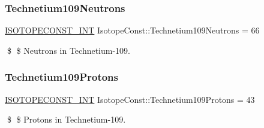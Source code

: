 \subsubsection{\texorpdfstring{Technetium109\+Neutrons}{Technetium109Neutrons}}
{\footnotesize\ttfamily \mbox{\hyperlink{group___isotope_const-_macros_ga5f18360b3e99483a35c32d789e62621c}{I\+S\+O\+T\+O\+P\+E\+C\+O\+N\+S\+T\+\_\+\+I\+NT}} Isotope\+Const\+::\+Technetium109\+Neutrons = 66}

\$ \$ Neutrons in Technetium-\/109. \mbox{\label{group___isotope_const-_technetium-_tc109_ga8ebdf212495b317ee0cb2e2f9d4a9c36}} 
\subsubsection{\texorpdfstring{Technetium109\+Protons}{Technetium109Protons}}
{\footnotesize\ttfamily \mbox{\hyperlink{group___isotope_const-_macros_ga5f18360b3e99483a35c32d789e62621c}{I\+S\+O\+T\+O\+P\+E\+C\+O\+N\+S\+T\+\_\+\+I\+NT}} Isotope\+Const\+::\+Technetium109\+Protons = 43}

\$ \$ Protons in Technetium-\/109. 